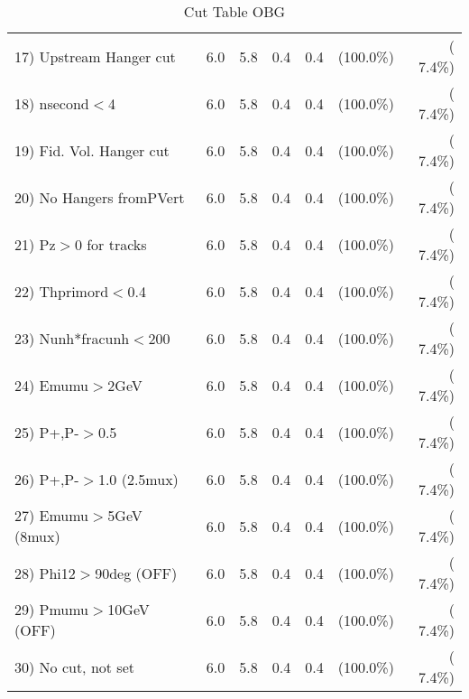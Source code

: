 \begin{table}[h!]
\begin{tabular}{||l||r|r|r|r|r|r||}
 17) Upstream Hanger cut  &          6.0 &          5.8 &          0.4 &          0.4 & (100.0\%) & (  7.4\%) \\
 18) nsecond$<$4          &          6.0 &          5.8 &          0.4 &          0.4 & (100.0\%) & (  7.4\%) \\
 19) Fid. Vol. Hanger cut &          6.0 &          5.8 &          0.4 &          0.4 & (100.0\%) & (  7.4\%) \\
 20) No Hangers fromPVert &          6.0 &          5.8 &          0.4 &          0.4 & (100.0\%) & (  7.4\%) \\
 21) Pz$>$0 for tracks    &          6.0 &          5.8 &          0.4 &          0.4 & (100.0\%) & (  7.4\%) \\
 22) Thprimord$<$0.4      &          6.0 &          5.8 &          0.4 &          0.4 & (100.0\%) & (  7.4\%) \\
 23) Nunh*fracunh$<$200   &          6.0 &          5.8 &          0.4 &          0.4 & (100.0\%) & (  7.4\%) \\
 24) Emumu$>$2GeV         &          6.0 &          5.8 &          0.4 &          0.4 & (100.0\%) & (  7.4\%) \\
 25) P+,P-$>$0.5          &          6.0 &          5.8 &          0.4 &          0.4 & (100.0\%) & (  7.4\%) \\
 26) P+,P-$>$1.0 (2.5mux) &          6.0 &          5.8 &          0.4 &          0.4 & (100.0\%) & (  7.4\%) \\
 27) Emumu$>$5GeV  (8mux) &          6.0 &          5.8 &          0.4 &          0.4 & (100.0\%) & (  7.4\%) \\
 28) Phi12$>$90deg  (OFF) &          6.0 &          5.8 &          0.4 &          0.4 & (100.0\%) & (  7.4\%) \\
 29) Pmumu$>$10GeV  (OFF) &          6.0 &          5.8 &          0.4 &          0.4 & (100.0\%) & (  7.4\%) \\
 30) No cut, not set      &          6.0 &          5.8 &          0.4 &          0.4 & (100.0\%) & (  7.4\%) \\
 \hline
 \hline
 \end{tabular}
 \caption{Cut Table  OBG      }
 \label{tab-cutcohjpsi-mumu_qe}
 \end{table}
